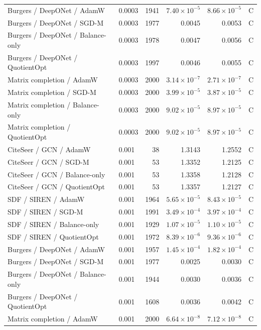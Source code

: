 \begin{longtable}{p{.34\linewidth}p{.09\linewidth}rrrr}
Burgers / DeepONet / AdamW & 0.0003 & 1941 & $7.40\!\times\!10^{-5}$ & $8.66\!\times\!10^{-5}$ & C\\
Burgers / DeepONet / SGD-M & 0.0003 & 1977 & 0.0045 & 0.0053 & C\\
Burgers / DeepONet / Balance-only & 0.0003 & 1978 & 0.0047 & 0.0056 & C\\
\rowcolor{oursbg}Burgers / DeepONet / QuotientOpt & 0.0003 & 1997 & 0.0046 & 0.0055 & C\\
Matrix completion / AdamW & 0.0003 & 2000 & $3.14\!\times\!10^{-7}$ & $2.71\!\times\!10^{-7}$ & C\\
Matrix completion / SGD-M & 0.0003 & 2000 & $3.99\!\times\!10^{-5}$ & $3.87\!\times\!10^{-5}$ & C\\
Matrix completion / Balance-only & 0.0003 & 2000 & $9.02\!\times\!10^{-5}$ & $8.97\!\times\!10^{-5}$ & C\\
\rowcolor{oursbg}Matrix completion / QuotientOpt & 0.0003 & 2000 & $9.02\!\times\!10^{-5}$ & $8.97\!\times\!10^{-5}$ & C\\
CiteSeer / GCN / AdamW & 0.001 & 38 & 1.3143 & 1.2552 & C\\
CiteSeer / GCN / SGD-M & 0.001 & 53 & 1.3352 & 1.2125 & C\\
CiteSeer / GCN / Balance-only & 0.001 & 53 & 1.3358 & 1.2128 & C\\
\rowcolor{oursbg}CiteSeer / GCN / QuotientOpt & 0.001 & 53 & 1.3357 & 1.2127 & C\\
SDF / SIREN / AdamW & 0.001 & 1964 & $5.65\!\times\!10^{-5}$ & $8.43\!\times\!10^{-5}$ & C\\
SDF / SIREN / SGD-M & 0.001 & 1991 & $3.49\!\times\!10^{-4}$ & $3.97\!\times\!10^{-4}$ & C\\
SDF / SIREN / Balance-only & 0.001 & 1929 & $1.07\!\times\!10^{-5}$ & $1.10\!\times\!10^{-5}$ & C\\
\rowcolor{oursbg}SDF / SIREN / QuotientOpt & 0.001 & 1972 & $8.39\!\times\!10^{-6}$ & $9.36\!\times\!10^{-6}$ & C\\
Burgers / DeepONet / AdamW & 0.001 & 1957 & $1.45\!\times\!10^{-4}$ & $1.82\!\times\!10^{-4}$ & C\\
Burgers / DeepONet / SGD-M & 0.001 & 1977 & 0.0025 & 0.0030 & C\\
Burgers / DeepONet / Balance-only & 0.001 & 1944 & 0.0030 & 0.0036 & C\\
\rowcolor{oursbg}Burgers / DeepONet / QuotientOpt & 0.001 & 1608 & 0.0036 & 0.0042 & C\\
Matrix completion / AdamW & 0.001 & 2000 & $6.64\!\times\!10^{-8}$ & $7.12\!\times\!10^{-8}$ & C\\

\end{longtable}
